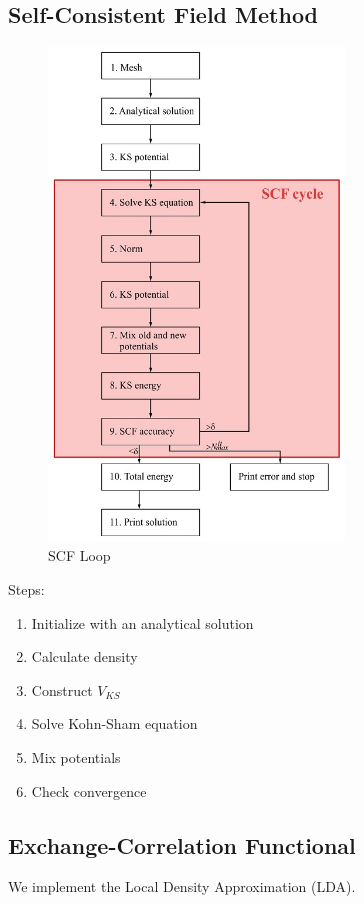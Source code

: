 \documentclass[12pt,a4paper]{article}
\begin{document}
\subsection{Self-Consistent Field Method}

\begin{figure}[H]
    \centering
    \includegraphics[width=0.7\textwidth]{SCFLoop.jpg}
    \caption{SCF Loop}
\end{figure}

Steps:
\begin{enumerate}
    \item Initialize with an analytical solution
    \item Calculate density
    \item Construct $V_{KS}$
    \item Solve Kohn-Sham equation
    \item Mix potentials
    \item Check convergence
\end{enumerate}

\subsection{Exchange-Correlation Functional}
We implement the Local Density Approximation (LDA).
\end{document}
